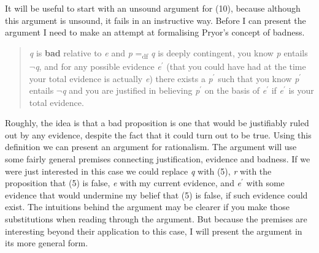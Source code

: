 \documentclass[
  11pt,
  letterpaper,
  DIV=11,
  numbers=noendperiod,
  oneside]{scrartcl}
\begin{document}
It will be useful to start with an unsound argument for (10), because
although this argument is unsound, it fails in an instructive way.
Before I can present the argument I need to make an attempt at
formalising Pryor's concept of badness.

\begin{quote}
\emph{q} is \textbf{bad} relative to \emph{e} and \emph{p}
=\textsubscript{df} \emph{q} is deeply contingent, you know \emph{p}
entails \(\neg\)\emph{q}, and for any possible evidence
\emph{e}\(^\prime\) (that you could have had at the time your total
evidence is actually \emph{e}) there exists a \emph{p}\(^\prime\) such
that you know \emph{p}\(^\prime\) entails \(\neg\)\emph{q} and you are
justified in believing \emph{p}\(^\prime\) on the basis of
\emph{e}\(^\prime\) if \emph{e}\(^\prime\) is your total evidence.
\end{quote}

Roughly, the idea is that a bad proposition is one that would be
justifiably ruled out by any evidence, despite the fact that it could
turn out to be true. Using
this definition we can present an argument for rationalism. The argument
will use some fairly general premises connecting justification, evidence
and badness. If we were just interested in this case we could replace
\emph{q} with (5), \emph{r} with the proposition that (5) is false,
\emph{e} with my current evidence, and \emph{e}\(^\prime\) with some
evidence that would undermine my belief that (5) is false, if such
evidence could exist. The intuitions behind the argument may be clearer
if you make those substitutions when reading through the argument. But
because the premises are interesting beyond their application to this
case, I will present the argument in its more general form.
\end{document}
